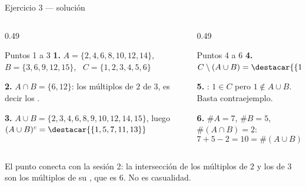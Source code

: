 \documentclass[aspectratio=169,10pt]{beamer}
\begin{document}
\begin{frame}{Ejercicio 3 — solución}
  \scriptsize
  \begin{columns}[T,onlytextwidth]
    \begin{column}{0.49\textwidth}
      \begin{block}{Puntos 1 a 3}
        \tiny
        \textbf{1.} $A=\{2,4,6,8,10,12,14\}$, \
        $B=\{3,6,9,12,15\}$, \ $C=\{1,2,3,4,5,6\}$

        \vspace{0.08cm}
        \textbf{2.} $A\cap B = \{6,12\}$: los múltiplos de $2$
         de $3$, es decir los .

        \vspace{0.08cm}
        \textbf{3.} $A\cup B=\{2,3,4,6,8,9,10,12,14,15\}$, luego
        $(A\cup B)^{c} = \destacar{\{1,5,7,11,13\}}$
      \end{block}
    \end{column}
    \begin{column}{0.49\textwidth}
      \begin{block}{Puntos 4 a 6}
        \tiny
        \textbf{4.} $C\setminus(A\cup B) = \destacar{\{1,5\}}$

        \vspace{0.08cm}
        \textbf{5.} : $1\in C$ pero $1\notin A\cup B$.
        Basta \azul{un} contraejemplo.

        \vspace{0.08cm}
        \textbf{6.} $\#A=7$, $\#B=5$, $\#(A\cap B)=2$:
        \[ 7+5-2 = 10 = \#(A\cup B) \ \checkmark \]
      \end{block}
    \end{column}
  \end{columns}

  \vspace{0.08cm}
  {\tiny\color{uniGris} El punto  conecta con la sesión 2: la
  intersección de los múltiplos de $2$ y los de $3$ son los múltiplos de su
  \azul{mcm}, que es $6$. No es casualidad.}
\end{frame}
\end{document}
